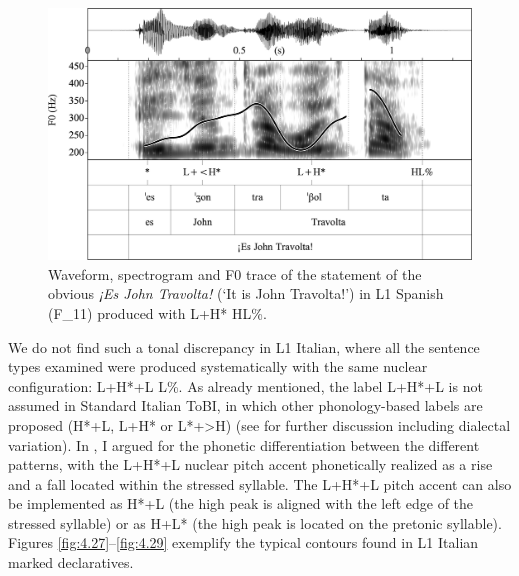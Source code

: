 \begin{figure}


\includegraphics[width=\textwidth]{figures/Figure_4.26.png}


\caption{Waveform, spectrogram and F0 trace of the statement of the obvious \textit{¡Es John Travolta!} (‘It is John Travolta!’) in L1 Spanish \mbox{(F\_11)} produced with L+H* HL\%.}
\label{fig:4.26}
\end{figure}

We do not find such a tonal discrepancy in L1 Italian, where all the sentence types examined were produced systematically with the same nuclear configuration: L+H*+L L\%. As already mentioned, the label L+H*+L is not assumed in Standard Italian ToBI, in which other phonology-based labels are proposed (H*+L, L+H* or L*+>H) (see \citealt{GiliFivelaEtAl2015} for further discussion including dialectal variation). In , I argued for the phonetic differentiation between the different patterns, with the L+H*+L nuclear pitch accent phonetically realized as a rise and a fall located within the stressed syllable. The L+H*+L pitch accent can also be implemented as H*+L (the high peak is aligned with the left edge of the stressed syllable) or as H+L* (the high peak is located on the pretonic syllable). Figures \ref{fig:4.27}--\ref{fig:4.29} exemplify the typical contours found in L1 Italian marked declaratives.

